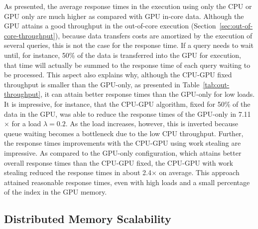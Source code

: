 As presented, the average response times in the execution using only 
the CPU or GPU only are much higher as compared with GPU in-core data. Although
the GPU attains a good throughput in the out-of-core execution
(Section~\ref{sec:out-of-core-throughput}), because data transfers costs 
are amortized by the execution of several queries, this is
not the case for the response time. If a query needs to wait until, for instance, 50\%
of the data is transferred into the GPU for execution, that time will actually be
summed to the response time of each query waiting to be processed. This aspect also
explains why, although the CPU-GPU fixed throughput is smaller than the GPU-only, 
as presented in Table~\ref{tab:out-throughput}, it can attain better response times than
the GPU-only for low loads. It is impressive, for instance, that the CPU-GPU algorithm, fixed
for 50\% of the data in the GPU, was able to reduce the response times of the 
GPU-only in 7.11$\times$ for a load $\lambda=0.2$. As the load increases, however, this
is inverted because queue waiting becomes a bottleneck due to the low CPU throughput. 
Further, the response times improvements with the CPU-GPU using work stealing
are impressive. As compared to the GPU-only configuration, which attains better overall
response times than the CPU-GPU fixed, the CPU-GPU with work stealing reduced the
response times in about 2.4$\times$ on average. This approach attained reasonable response
times, even with high loads and a small percentage of the index in the GPU memory. 

\subsection{Distributed Memory Scalability}

